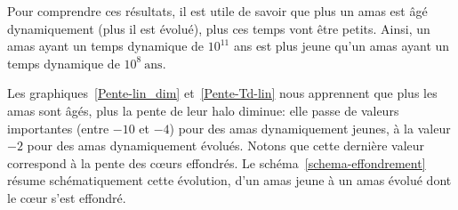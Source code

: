 






		Pour comprendre ces résultats, il est utile de savoir que plus un amas est âgé
		dynamiquement (plus il est évolué), plus ces temps vont être petits. Ainsi, un amas
		ayant un temps dynamique de $10^{11}$ ans est plus jeune qu'un amas ayant un temps
		dynamique de $10^{8}\ \mathrm{ans}$.

		
		Les graphiques~\ref{Pente-lin_dim} et~\ref{Pente-Td-lin} nous apprennent que
		plus les amas sont âgés, plus la pente de leur halo diminue: elle passe de
		valeurs importantes (entre $-10$ et $-4$) pour des amas dynamiquement jeunes, à la valeur
		$-2$ pour des amas dynamiquement évolués. Notons que cette dernière valeur correspond à la pente des cœurs
		effondrés.
		Le schéma~\ref{schema-effondrement} résume schématiquement cette évolution,
		d'un amas jeune à un amas évolué dont le cœur s'est effondré.

